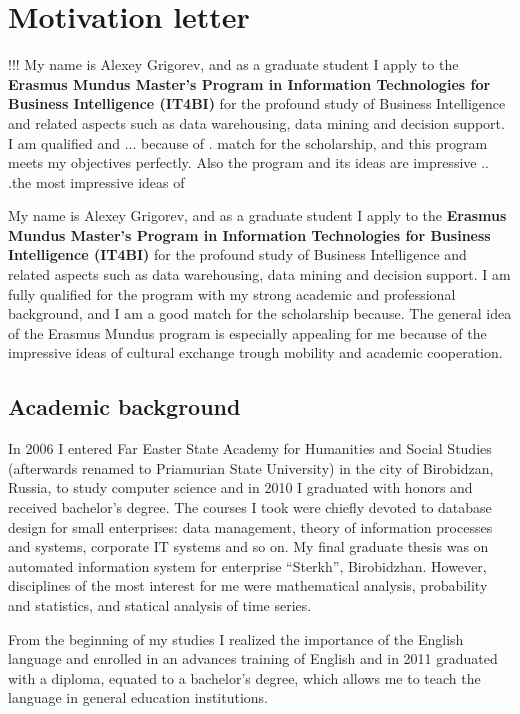 \documentclass[a4paper,14pt]{extarticle}
\begin{document}
\section*{Motivation letter}

!!!
My name is Alexey Grigorev, and as a graduate student I apply to the \textbf{Erasmus Mundus Master's Program in Information Technologies for Business Intelligence (IT4BI)} for the profound study of Business Intelligence and related aspects such as data warehousing, data mining and decision support. I am qualified and ... because of . match for the scholarship, and this program meets my objectives perfectly. Also the program and its ideas are impressive .. .the most impressive ideas of

My name is Alexey Grigorev, and as a graduate student I apply to the \textbf{Erasmus Mundus Master's Program in Information Technologies for Business Intelligence (IT4BI)} for the profound study of Business Intelligence and related aspects such as data warehousing, data mining and decision support. I am fully qualified for the program with my strong academic and professional background, and I am a good match for the scholarship because. The general idea of the Erasmus Mundus program is especially appealing for me because of the impressive ideas of  cultural exchange trough mobility and academic cooperation. 


\subsection*{Academic background}

In 2006 I entered Far Easter State Academy for Humanities and Social Studies (afterwards renamed to Priamurian State University) in the city of Birobidzan, Russia, to study computer science and in 2010 I graduated with honors and received bachelor's degree. The courses I took were chiefly devoted to database design for small enterprises: data management, theory of information processes and systems, corporate IT systems and so on. My final graduate thesis was on automated information system for enterprise ``Sterkh'', Birobidzhan. However, disciplines of the most interest for me were mathematical analysis, probability and statistics, and statical analysis of time series.

From the beginning of my studies I realized the importance of the English language and enrolled in an advances training of English and in 2011 graduated with a diploma, equated to a bachelor's degree, which allows me to teach the language in general education institutions.
\end{document}
